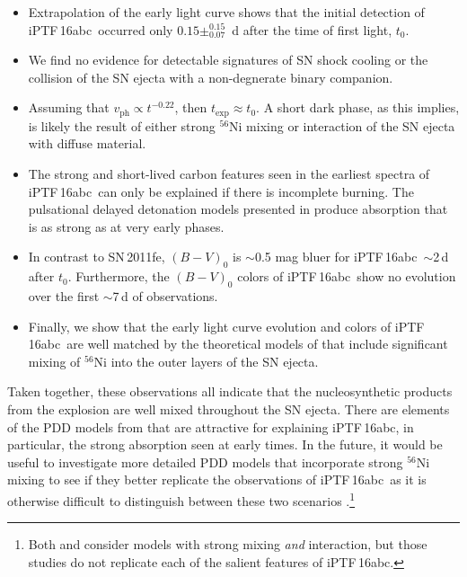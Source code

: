 \documentclass[twocolumn]{aastex61}
\newcommand{\abc}{iPTF\,16abc}
\begin{document}
\begin{itemize}
    \item Extrapolation of the early light curve shows that the initial detection of \abc\ occurred only $0.15\pm_{0.07}^{0.15}$~d after the time of first light, $t_0$.

    \item We find no evidence for detectable signatures of SN shock cooling or the collision of the SN ejecta with a non-degnerate binary companion.

    \item Assuming that $v_\mathrm{ph} \propto t^{-0.22}$, then $t_\mathrm{exp} \approx t_0$. A short dark phase, as this implies, is likely the result of either strong $^{56}$Ni mixing or interaction of the SN ejecta with diffuse material.

    \item The strong and short-lived carbon features seen in the 
earliest spectra of \abc\ can only be explained if there is incomplete burning. The pulsational delayed detonation models presented in \citet{2014MNRAS.441..532D} produce  absorption that is as strong as  at very early phases.

    \item In contrast to SN\,2011fe, $(B - V)_0$ is $\sim$0.5 mag bluer for \abc\ $\sim$2\,d after $t_0$. Furthermore, the $(B - V)_0$ colors of \abc\ show no evolution over the first $\sim$7\,d  of observations.

    \item Finally, we show that the early light curve evolution and colors of \abc\ are well matched by the theoretical models of \citet{2016ApJ...826...96P} that include significant mixing of $^{56}$Ni into the outer layers of the SN ejecta. 
 
\end{itemize}
%
Taken together, these observations all indicate that the nucleosynthetic products from the explosion are well mixed throughout the SN ejecta. There are elements of the PDD models from \citet{2014MNRAS.441..532D} that are attractive for explaining \abc, in particular, the strong  absorption seen at early times. In the future, it would be useful to investigate more detailed PDD models that incorporate strong $^{56}$Ni mixing to see if they better replicate the observations of \abc\ as it is otherwise difficult to distinguish between these two scenarios \citep{2017arXiv170603613N}.\footnote{Both \citet{2014MNRAS.441..532D} and \citet{2016ApJ...826...96P} consider models with strong mixing \textit{and} interaction, but those studies do not replicate each of the salient features of \abc.}  
\end{document}
